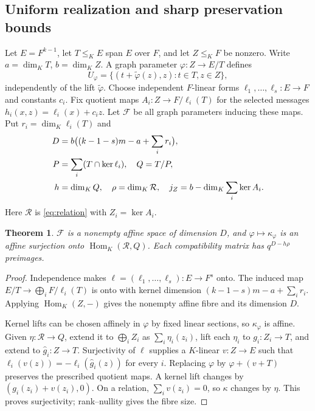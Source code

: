 \documentclass[12pt,letterpaper,onecolumn]{article}
\newtheorem{theorem}{Theorem}
\theoremstyle{definition}
\begin{document}
\subsection{Uniform realization and sharp preservation bounds}
Let $E=F^{k-1}$, let $T\le_K E$ span $E$ over $F$, and let $Z\le_K F$ be nonzero. Write $a=\dim_KT$, $b=\dim_KZ$. A graph parameter $\varphi:Z\to E/T$ defines
\begin{equation}
 U_\varphi=\{(t+\widetilde\varphi(z),z):t\in T,z\in Z\},
 \label{eq:general-graph}
\end{equation}
independently of the lift $\widetilde\varphi$. Choose independent $F$-linear forms $\ell_1,\ldots,\ell_s:E\to F$ and constants $c_i$. Fix quotient maps $A_i:Z\to F/\ell_i(T)$ for the selected messages $h_i(x,z)=\ell_i(x)+c_i z$. Let $\mathscr F$ be all graph parameters inducing these maps. Put $r_i=\dim_K\ell_i(T)$ and
\begin{align}
 D&=b\bigl((k-1-s)m-a+\sum_i r_i\bigr),\notag\\
 P&=\sum_i(T\cap\ker\ell_i),\quad Q=T/P,\notag\\
 h&=\dim_KQ,\quad \rho=\dim_K\mathcal R,\quad
 j_Z=b-\dim_K\sum_i\ker A_i.\notag
\end{align}
Here $\mathcal R$ is \eqref{eq:relation} with $Z_i=\ker A_i$.

\begin{theorem}\label{thm:realize}
$\mathscr F$ is a nonempty affine space of dimension $D$, and $\varphi\mapsto\kappa_\varphi$ is an affine surjection onto $\operatorname{Hom}_K(\mathcal R,Q)$. Each compatibility matrix has $q^{D-h\rho}$ preimages.
\end{theorem}
\begin{proof}
Independence makes $\ell=(\ell_1,\ldots,\ell_s):E\to F^s$ onto. The induced map $E/T\to\bigoplus_i F/\ell_i(T)$ is onto with kernel dimension $(k-1-s)m-a+\sum_i r_i$. Applying $\operatorname{Hom}_K(Z,-)$ gives the nonempty affine fibre and its dimension $D$.

Kernel lifts can be chosen affinely in $\varphi$ by fixed linear sections, so $\kappa_\varphi$ is affine. Given $\eta:\mathcal R\to Q$, extend it to $\bigoplus_iZ_i$ as $\sum_i\eta_i(z_i)$, lift each $\eta_i$ to $g_i:Z_i\to T$, and extend to $\widehat g_i:Z\to T$. Surjectivity of $\ell$ supplies a $K$-linear $v:Z\to E$ such that $\ell_i(v(z))=-\ell_i(\widehat g_i(z))$ for every $i$. Replacing $\varphi$ by $\varphi+(v+T)$ preserves the prescribed quotient maps. A kernel lift changes by $(g_i(z_i)+v(z_i),0)$. On a relation, $\sum_i v(z_i)=0$, so $\kappa$ changes by $\eta$. This proves surjectivity; rank--nullity gives the fibre size.
\end{proof}
\end{document}
